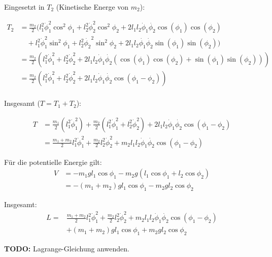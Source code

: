 \documentclass[a4paper,german,12pt,smallheadings]{scrartcl}
\begin{document}
Eingesetzt in $T_2$ (Kinetische Energe von $m_2$):

\begin{align*}
  T_2 &= \frac{m_2}{2} (l_1^2 \dot{\phi}_1^2 \cos^2 \phi_1 + l_2^2 \dot{\phi}_2^2 \cos^2 \phi_2 + 2l_1l_2\dot{\phi}_1\dot{\phi_2}\cos(\phi_1) \cos(\phi_2) \\
      &\quad + l_1^2 \dot{\phi}_1^2 \sin^2 \phi_1 + l_2^2 \dot{\phi_2}^2 \sin^2 \phi_2 + 2l_1l_2\dot{\phi_1}\dot{\phi_2}\sin(\phi_1)\sin(\phi_2)) \\
      &= \frac{m_2}{2} (l_1^2 \dot{\phi}_1^2 + l_2^2 \dot{\phi}_2^2 + 2l_1l_2\dot{\phi}_1\dot{\phi_2} (\cos(\phi_1) \cos(\phi_2) + \sin(\phi_1)\sin(\phi_2))) \\
      &= \frac{m_2}{2} (l_1^2 \dot{\phi}_1^2 + l_2^2 \dot{\phi}_2^2 + 2l_1l_2\dot{\phi}_1\dot{\phi_2} \cos(\phi_1 - \phi_2)) \\
\end{align*}

Insgesamt ($T = T_1 + T_2$):

\begin{align*}
  T &= \frac{m_1}{2} (l_1^2 \dot{\phi}_1^2) + \frac{m_2}{2} (l_1^2 \dot{\phi}_1^2 + l_2^2 \dot{\phi}_2^2) + 2l_1l_2\dot{\phi}_1\dot{\phi_2} \cos(\phi_1 - \phi_2) \\
    &= \frac{m_1 + m_2}{2} l_1^2 \dot{\phi}_1^2 + \frac{m_2}{2} l_2^2 \dot{\phi}_2^2 + m_2l_1l_2\dot{\phi}_1\dot{\phi_2} \cos(\phi_1 - \phi_2)
\end{align*}

Für die potentielle Energie gilt:
\begin{align*}
  V &= -m_1gl_1 \cos \phi_1 - m_2g(l_1 \cos \phi_1 + l_2 \cos \phi_2) \\
    &= -(m_1 + m_2)gl_1 \cos \phi_1 - m_2gl_2 \cos \phi_2
\end{align*}

Insgesamt:
\begin{align*}
  L = &\frac{m_1 + m_2}{2} l_1^2 \dot{\phi}_1^2 + \frac{m_2}{2} l_2^2 \dot{\phi}_2^2 + m_2l_1l_2\dot{\phi}_1\dot{\phi_2} \cos(\phi_1 - \phi_2) \\
      &+(m_1 + m_2)gl_1 \cos \phi_1 + m_2gl_2 \cos \phi_2
\end{align*}

\textbf{TODO:} Lagrange-Gleichung anwenden.
\end{document}
